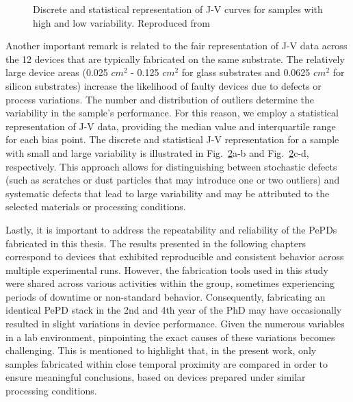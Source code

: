 \begin{figure}[ht!]
\begin{subfigure}[t]{0.4\textwidth}
        \caption{}
        \label{fig:ch2:low_yield_median}
    \end{subfigure}
    \caption{Discrete and statistical representation of J-V curves for samples with high and low variability. Reproduced from \cite{Bowring2018ReverseCells}}
    \label{fig:ch2:discrete_and_median}
\end{figure}


Another important remark is related to the fair representation of J-V data across the 12 devices that are typically fabricated on the same substrate. The relatively large device areas (0.025 $cm^2$ - 0.125 $cm^2$ for glass substrates and 0.0625 $cm^2$ for silicon substrates) increase the likelihood of faulty devices due to defects or process variations. The number and distribution of outliers determine the variability in the sample's performance. For this reason,
we employ a statistical representation of J-V data, providing the median value and interquartile range for each bias point. The discrete and statistical J-V representation for a sample with small and large variability is illustrated in Fig.~\ref{fig:ch2:discrete_and_median}a-b and Fig.~\ref{fig:ch2:discrete_and_median}c-d, respectively. This approach allows for distinguishing between stochastic defects (such as scratches or dust particles that may introduce one or two outliers) and systematic defects that lead to large variability and may be attributed to the selected materials or processing conditions. 


Lastly, it is important to address the repeatability and reliability of the PePDs fabricated in this thesis. The results presented in the following chapters correspond to devices that exhibited reproducible and consistent behavior across multiple experimental runs. However, the fabrication tools used in this study were shared across various activities within the group, sometimes experiencing periods of downtime or non-standard behavior. Consequently, fabricating an identical PePD stack in the 2nd and 4th year of the PhD may have occasionally resulted in slight variations in device performance. Given the numerous variables in a lab environment, pinpointing the exact causes of these variations becomes challenging. This is mentioned to highlight that, in the present work, only samples fabricated within close temporal proximity are compared in order to ensure meaningful conclusions, based on devices prepared under similar processing conditions.

 


\cleardoublepage

